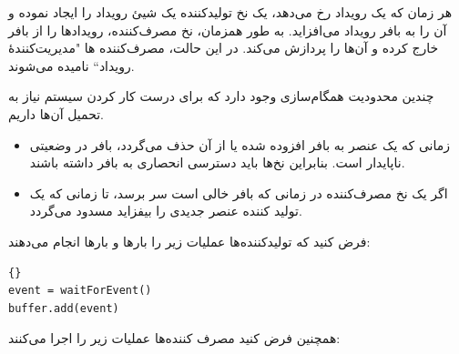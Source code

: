 \documentclass{book}
\begin{document}

    هر زمان که یک رویداد رخ می‌دهد، یک نخ تولید‌کننده یک شیئ رویداد را ایجاد نموده و آن را به بافر رویداد می‌افزاید. 
    به طور همزمان، نخ مصرف‌کننده، رویدادها را از بافر خارج کرده و آن‌ها را پردازش می‌کند. 
    در این حالت، مصرف‌کننده ها "مدیریت‌کنندهٔ رویداد`` نامیده می‌شوند.

    چندین محدودیت همگام‌سازی وجود دارد که برای درست کار کردن سیستم نیاز به تحمیل آن‌ها داریم.

\begin{itemize}

\item 
    زمانی که یک عنصر به بافر افزوده شده یا از آن حذف می‌گردد، بافر در وضعیتی ناپایدار است.
    بنابراین نخ‌ها باید دسترسی انحصاری به بافر داشته باشند.
    
\item 
    اگر یک نخ مصرف‌کننده در زمانی که بافر خالی است سر برسد، تا زمانی که یک تولید کننده عنصر جدیدی را بیفزاید مسدود می‌گردد.

\end{itemize}

    فرض کنید که تولیدکننده‌ها عملیات زیر را بارها و بارها انجام می‌دهند:

\begin{latin}
\begin{latin}
\begin{lstlisting}[title=\rl{کد پایه تولیدکننده}]{}
event = waitForEvent()
buffer.add(event)
\end{lstlisting}
\end{latin}
\end{latin}

    همچنین فرض کنید مصرف کننده‌ها عملیات زیر را اجرا می‌کنند:
\end{document}
